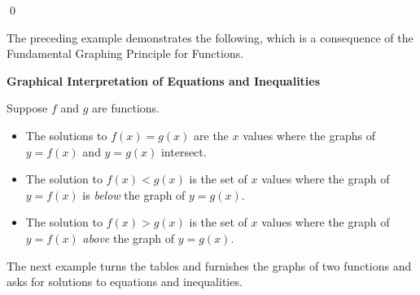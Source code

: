 \begin{ex}
\begin{enumerate}
\begin{tabular}{cc}
\end{tabular}

\end{enumerate}

\qed
\end{ex}

The preceding example demonstrates the following, which is a consequence of the Fundamental Graphing Principle for Functions.

\smallskip

\colorbox{ResultColor}{\bbm

\centerline{\textbf{Graphical Interpretation of Equations and Inequalities}}

\smallskip

\hspace{.17in} Suppose $f$ and $g$ are functions.  

\begin{itemize}

\item  The solutions to $f(x)=g(x)$ are the $x$ values where the graphs of $y=f(x)$ and $y=g(x)$ intersect.

\item  The solution to $f(x) < g(x)$ is the set of $x$ values where the graph of $y=f(x)$ is \textit{below} the graph of $y=g(x)$.

\item  The solution to $f(x) > g(x)$ is the set of $x$ values where the graph of $y=f(x)$ \textit{above} the graph of $y=g(x)$.

\end{itemize}

\ebm}

\medskip

The next example turns the tables and furnishes the graphs of two functions and asks for solutions to equations and inequalities.


